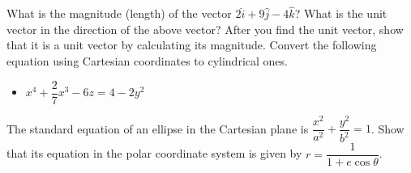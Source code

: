 \documentclass[12pt,addpoints]{exam}
\begin{document}
\begin{questions}
		\vspace{1in}
		\question What is the magnitude (length) of the vector  $2\hat{i}+9\hat{j}-4\hat{k}$?\vspace{1in}
		\question What is the unit vector in the direction of the above vector? After you find the unit vector, show that it is a unit vector by calculating its magnitude.\vspace{1in}
		\question Convert the following equation using Cartesian coordinates to cylindrical ones.\begin{itemize}
			\item ${x^4} + \dfrac{2}{7}{x^3} - 6z = 4 - 2{y^2}$\vspace{1.5in}
		\end{itemize} 
		\question The standard equation of an ellipse in the Cartesian plane is $\dfrac{x^2}{a^2}+\dfrac{y^2}{b^2}=1$. Show that its equation in the polar coordinate system is given by $r = \dfrac{1}{1+e \cos \theta}$.\vspace{2in}
		

\end{questions}
\end{document}
